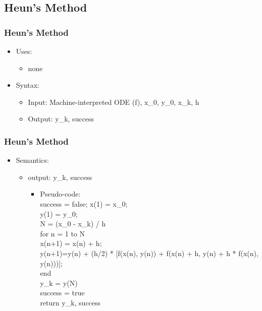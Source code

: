 \documentclass{beamer}
\begin{document}
\subsection {Heun's Method}

\begin{frame}
\frametitle{Heun's Method}
\begin{itemize}
\item Uses:
	\begin{itemize}
		\item none
	\end{itemize}
\item Syntax:
	\begin{itemize}
		\item Input: Machine-interpreted ODE (f), x\_0, y\_0, x\_k, h
		\item Output: y\_k, success
	\end{itemize}
\end{itemize}
\end{frame}

\begin{frame}
\frametitle{Heun's Method}
\begin{itemize}
\item Semantics:
	\begin{itemize}
		\item output: y\_k, success\\
		\begin{itemize}
		\item Pseudo-code:\\
			success = false;
			x(1) = x\_0;\\
			y(1) = y\_0;\\
			N =  (x\_0 - x\_k) / h\\
			for n = 1 to N \\%
				x(n+1) = x(n) + h;\\
				y(n+1)=y(n) + (h/2) * [f(x(n), y(n)) + f(x(n) + h, y(n) + h * f(x(n), y(n)))];\\
			end\\
			y\_k = y(N)\\
			success = true\\
			return y\_k, success
		\end{itemize}
	\end{itemize}
\end{itemize}
\end{frame}


\end{document}
